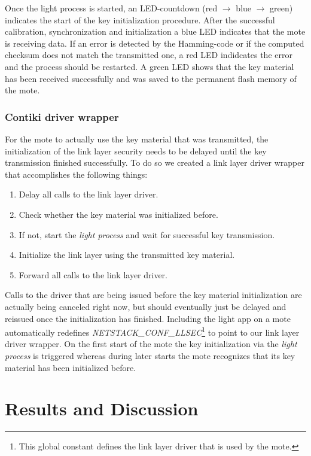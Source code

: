 \documentclass{sig-alternate} %
\begin{document}
Once the light process is started, an LED-countdown (red $\rightarrow$ blue $\rightarrow$ green) indicates the start of the key initialization procedure.
After the successful calibration, synchronization and initialization a blue LED indicates that the mote is receiving data.
If an error is detected by the Hamming-code or if the computed checksum does not match the transmitted one, a red LED indidcates the error and the process should be restarted.
A green LED shows that the key material has been received successfully and was saved to the permanent flash memory of the mote.

\subsubsection{Contiki driver wrapper}
\label{ssub:contiki_driver_wrapper}

For the mote to actually use the key material that was transmitted, the initialization of the link layer security needs to be delayed until the key transmission finished successfully.
To do so we created a link layer driver wrapper that accomplishes the following things:

\begin{enumerate}
	\item Delay all calls to the link layer driver.
	\item Check whether the key material was initialized before.
	\item If not, start the \textit{light process} and wait for successful key transmission.
	\item Initialize the link layer using the transmitted key material.
	\item Forward all calls to the link layer driver.
\end{enumerate}

Calls to the driver that are being issued before the key material initialization are actually being canceled right now, but should eventually just be delayed and reissued once the initialization has finished.
Including the light app on a mote automatically redefines \textit{NETSTACK\_CONF\_LLSEC}\footnote{This global constant defines the link layer driver that is used by the mote.} to point to our link layer driver wrapper.
On the first start of the mote the key initialization via the \textit{light process} is triggered whereas during later starts the mote recognizes that its key material has been initialized before.


\section{Results and Discussion}
\label{sec:results_and_discussion}
\end{document}
